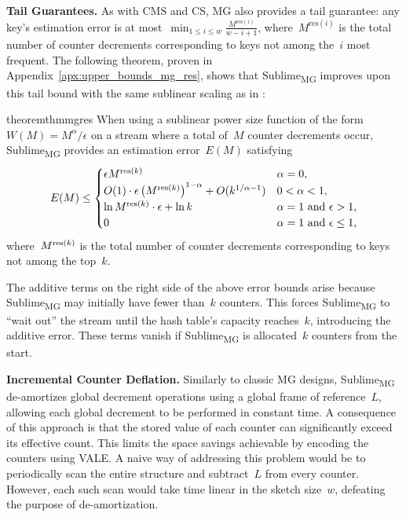 \documentclass[sigconf]{acmart}
\newcommand{\sketch}{Sublime}
\newcommand{\sketchmg}{\sketch\textsubscript{MG}\xspace}
\newcommand{\counterencodingabbrv}{VALE}
\newcommand{\parentheses}[1]{\left(#1\right)}
\begin{document}
\textbf{Tail Guarantees.}
As with CMS and CS, MG also provides a tail guarantee: any key's estimation error is at most~$\min_{1 \leq i \leq w} \frac{M^{\mathrm{res}(i)}}{w-i+1}$, where~$M^{\mathrm{res}(i)}$ is the total number of counter decrements corresponding to keys not among the~$i$ most frequent.
The following theorem, proven in Appendix~\ref{apx:upper_bounds_mg_res}, shows that \sketchmg improves upon this tail bound with the same sublinear scaling as in :
\begin{restatable}{theorem}{thmmgres}
    \label{thm:mg-res}
    When using a sublinear power size function of the form~$W(M)=M^\alpha/\epsilon$ on a stream where a total of~$M$ counter decrements occur, \sketchmg provides an estimation error~$E(M)$ satisfying
    $$
    E(M) \leq  
    \begin{cases}
        \epsilon M^{\textup{res}(k)} & \text{$\alpha=0$,} \\
        O(1) \cdot \epsilon \parentheses{M^{\textup{res}(k)}}^{1-\alpha} + O(k^{1/\alpha-1}) & \text{$0<\alpha<1$,} \\
        \ln M^{\textup{res}(k)} \cdot \epsilon + \ln k  & \text{$\alpha=1$ \textup{and} $\epsilon > 1$,} \\
        0  & \text{$\alpha=1$ \textup{and} $\epsilon \leq 1$,}
    \end{cases}
    $$
    where~$M^{\textup{res}(k)}$ is the total number of counter decrements corresponding to keys not among the top~$k$.
\end{restatable}
The additive terms on the right side of the above error bounds arise because \sketchmg may initially have fewer than~$k$ counters.
This forces \sketchmg to ``wait out'' the stream until the hash table's capacity reaches~$k$, introducing the additive error.
These terms vanish if \sketchmg is allocated~$k$ counters from the start.

\textbf{Incremental Counter Deflation.}
Similarly to classic MG designs, \sketchmg de-amortizes global decrement operations using a global frame of reference~$L$, allowing each global decrement to be performed in constant time.
A consequence of this approach is that the stored value of each counter can significantly exceed its effective count.
This limits the space savings achievable by encoding the counters using \counterencodingabbrv.
A naive way of addressing this problem would be to periodically scan the entire structure and subtract~$L$ from every counter.
However, each such scan would take time linear in the sketch size~$w$, defeating the purpose of de-amortization.
\end{document}
